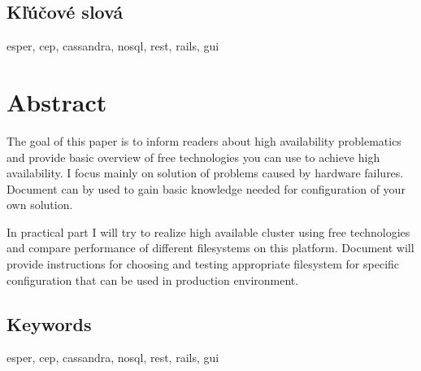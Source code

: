 \documentclass[12pt, a4paper, oneside]{book} %
\begin{document}
\section*{Kľúčové slová}
esper, cep, cassandra, nosql, rest, rails, gui \emptydoublepage

\chapter*{Abstract}
The goal of this paper is to inform readers about high availability problematics and provide basic overview of free technologies you can use to achieve high availability. I focus mainly on solution of problems caused by hardware failures. Document can by used to gain basic knowledge needed for configuration of your own solution.

In practical part I will try to realize high available cluster using free technologies and compare performance of different filesystems on this platform. Document will provide instructions for choosing and testing appropriate filesystem for specific configuration that can be used in production environment.

\section*{Keywords}
esper, cep, cassandra, nosql, rest, rails, gui \emptydoublepage

\tableofcontents \emptydoublepage

\mainmatter












\backmatter

	\emptydoublepage

\listoffigures \emptydoublepage
\listoftables
\end{document}
